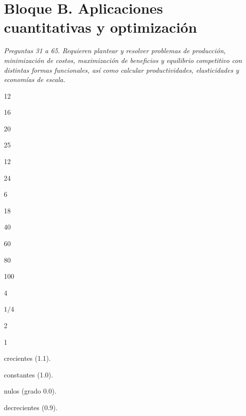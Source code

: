 \section*{Bloque B. Aplicaciones cuantitativas y optimización}

\noindent\textit{Preguntas 31 a 65. Requieren plantear y resolver problemas de producción, minimización de costos, maximización de beneficios y equilibrio competitivo con distintas formas funcionales, así como calcular productividades, elasticidades y economías de escala.}

\begin{opts}
    \item 12
    \item 16
    \item 20
    \item 25
\end{opts}

\begin{opts}
    \item 12
    \item 24
    \item 6
    \item 18
\end{opts}

\begin{opts}
    \item 40
    \item 60
    \item 80
    \item 100
\end{opts}

\begin{opts}
    \item 4
    \item $1/4$
    \item 2
    \item 1
\end{opts}

\begin{opts}
    \item crecientes (1.1).
    \item constantes (1.0).
    \item nulos (grado 0.0).
    \item decrecientes (0.9).
\end{opts}

